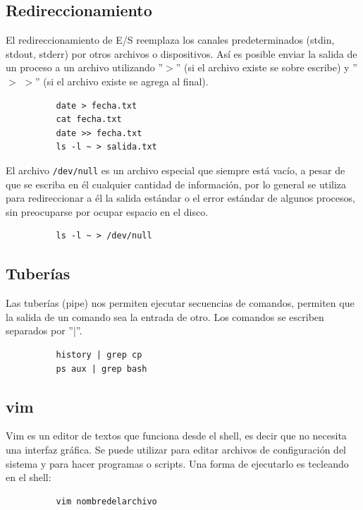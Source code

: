 \documentclass[12pt]{article}
\begin{document}
\subsection{Redireccionamiento}

 El redireccionamiento de E/S reemplaza los canales predeterminados (stdin, stdout, stderr) por otros archivos o dispositivos. Así es posible enviar la salida de un proceso a un archivo utilizando ''$>$'' (si el archivo existe se sobre escribe) y ''$>$ $>$'' (si el archivo existe se agrega al final). 
\begin{verbatim}
          date > fecha.txt
          cat fecha.txt
          date >> fecha.txt
          ls -l ~ > salida.txt
\end{verbatim}

El archivo \texttt{/dev/null} es un archivo especial que siempre está vacío, a pesar de que se escriba en él cualquier cantidad de información, por lo general se utiliza para redireccionar a él la salida estándar o el error estándar de algunos procesos, sin preocuparse por  ocupar espacio en el disco.

\begin{verbatim}
          ls -l ~ > /dev/null
\end{verbatim}

\subsection{Tuberías}

Las tuberías (pipe) nos permiten ejecutar secuencias de comandos, permiten que la salida de un comando sea la entrada de otro. Los comandos se escriben separados por ''{\ttfamily |}''.

\begin{verbatim}
          history | grep cp
          ps aux | grep bash
\end{verbatim}

\subsection{vim}

Vim es un editor de textos que funciona desde el shell, es decir que no necesita una interfaz gráfica. Se puede utilizar para editar archivos de configuración del sistema y para hacer programas o scripts. Una forma de ejecutarlo es tecleando en el shell:

\begin{verbatim}
          vim nombredelarchivo
\end{verbatim}	
\end{document}
